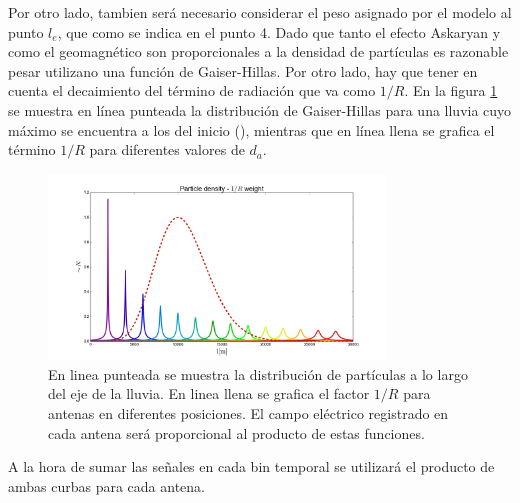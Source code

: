 	Por otro lado, tambien será necesario considerar el peso asignado por el modelo al punto $l_e$, que como se indica en el punto 4. 
	Dado que tanto el efecto Askaryan y como el geomagnético son proporcionales a la densidad de partículas es razonable pesar utilizano una función de Gaiser-Hillas.
	Por otro lado, hay que tener en cuenta el decaimiento del término de radiación que va como $1/R$.
	En la figura \ref{fig:timeDelay_pd} se muestra en línea punteada la distribución de Gaiser-Hillas para una lluvia cuyo máximo se encuentra a los  del inicio (), mientras que en línea llena se grafica el término $1/R$ para diferentes valores de $d_a$.
	\begin{figure}[ht!]
		\centering
		\includegraphics[width=0.8\textwidth]{./fig/EASRadio/timeDelay_pd}
		\caption{\label{fig:timeDelay_pd}
		En linea punteada se muestra la distribuci\'on de part\'iculas a lo largo del eje de la lluvia. En linea llena se grafica el factor $1/R$ para antenas en diferentes posiciones.
		El campo el\'ectrico registrado en cada antena ser\'a proporcional al producto de estas funciones.
		}
	\end{figure}
	A la hora de sumar las señales en cada bin temporal se utilizará el producto de ambas curbas para cada antena.
	
